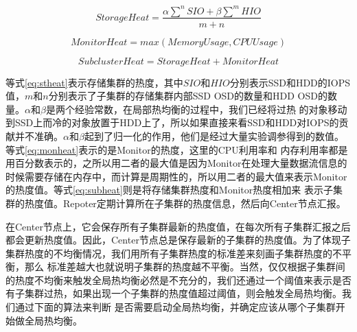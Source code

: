 \begin{equation}
    \label{eq:stheat}
    StorageHeat = \frac{\alpha \sum^n SIO + \beta \sum^m HIO}{m+n}
\end{equation}

\begin{equation}
    \label{eq:monheat}
    MonitorHeat = max(MemoryUsage, CPUUsage)
\end{equation}

\begin{equation}
    \label{eq:subheat}
    SubclusterHeat = StorageHeat + MonitorHeat
\end{equation}

等式\ref{eq:stheat}表示存储集群的热度，其中$SIO$和$HIO$分别表示SSD和HDD的IOPS值，$m$和$n$分别表示了子集群的存储集群内部SSD OSD的数量和HDD OSD的数量。$\alpha$和$\beta$是两个经验常数，在局部热均衡的过程中，我们已经将过热
的对象移动到SSD上而冷的对象放置于HDD上了，所以如果直接来看SSD和HDD对IOPS的贡献并不准确。$\alpha$和$\beta$起到了归一化的作用，他们是经过大量实验调参得到的数值。等式\ref{eq:monheat}表示的是Monitor的热度，这里的CPU利用率和
内存利用率都是用百分数表示的，之所以用二者的最大值是因为Monitor在处理大量数据流信息的时候需要存储在内存中，而计算是周期性的，所以用二者的最大值来表示Monitor的热度值。等式\ref{eq:subheat}则是将存储集群热度和Monitor热度相加来
表示子集群的热度值。Repoter定期计算所在子集群的热度信息，然后向Center节点汇报。

在Center节点上，它会保存所有子集群最新的热度值，在每次所有子集群汇报之后都会更新热度值。因此，Center节点总是保存最新的子集群的热度值。为了体现子集群热度的不均衡情况，我们用所有子集群热度的标准差来刻画子集群热度的不平衡，那么
标准差越大也就说明子集群的热度越不平衡。当然，仅仅根据子集群间的热度不均衡来触发全局热均衡必然是不充分的，我们还通过一个阈值来表示是否有子集群过热，如果出现一个子集群的热度值超过阈值，则会触发全局热均衡。我们通过下面的算法来判断
是否需要启动全局热均衡，并确定应该从哪个子集群开始做全局热均衡。

